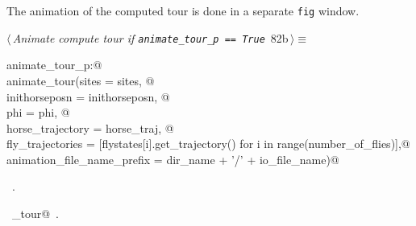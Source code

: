 \documentclass[11.5pt]{report}
\begin{document}
\vspace{-0.8cm} \newchunk The animation of the computed tour is done in a separate \verb|fig| window. 
\begin{flushleft} \small
\begin{minipage}{\linewidth}\label{scrap131}\raggedright\small
{} $\langle\,${\itshape Animate compute tour if \verb|animate_tour_p == True|}\nobreak\ {\footnotesize {82b}}$\,\rangle\equiv$
\vspace{-1ex}
\begin{list}{}{} \item
\mbox{}\verb@if animate_tour_p:@\\
\mbox{}\verb@    animate_tour(sites            = sites, @\\
\mbox{}\verb@                 inithorseposn    = inithorseposn, @\\
\mbox{}\verb@                 phi              = phi, @\\
\mbox{}\verb@                 horse_trajectory = horse_traj, @\\
\mbox{}\verb@                 fly_trajectories = [flystates[i].get_trajectory() for i in range(number_of_flies)],@\\
\mbox{}\verb@                 animation_file_name_prefix = dir_name + '/' + io_file_name)@\\
\mbox{}\verb@@{\NWsep}
\end{list}
\vspace{-1.5ex}
\footnotesize
\begin{list}{}{\setlength{\itemsep}{-\parsep}\setlength{\itemindent}{-\leftmargin}}
\item \NWtxtMacroRefIn\ .
\item \NWtxtIdentsUsed\nobreak\  \verb@animate_tour@\nobreak\ .
\item{}
\end{list}
\end{minipage}\vspace{4ex}
\end{flushleft}
\end{document}
